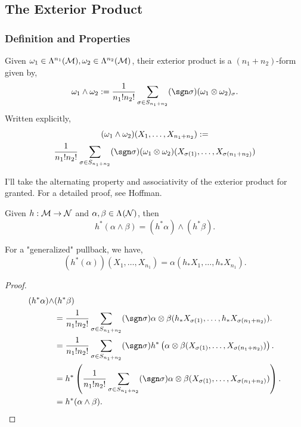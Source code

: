 \documentclass[../main.tex]{subfiles}
\begin{document}
    \subsection{The Exterior Product}
    \subsubsection{Definition and Properties}
    \begin{definition}\label{def:exterior-product}
        Given \(\omega_1 \in \form{n_1}{M}, \omega_2 \in \form{n_2}{M}\), their 
        exterior product is a \((n_1+n_2)\)-form given by, 
        \[
        \omega_1 \wedge \omega_2
         := \frac{1}{n_1!n_2!}
        \sum_{\sigma \in S_{n_1+n_2}}^{} (\sgn\sigma)(\omega_1 \otimes \omega_2)_\sigma.
        \]
        Written explicitly, 
        \begin{multline*}
        (\omega_1 \wedge \omega_2)(X_{1}, \dots, X_{n_1+n_2}):= \\
        \frac{1}{n_1!n_2!}
        \sum_{\sigma \in S_{n_1+n_2}}^{} (\sgn\sigma)(\omega_1 \otimes \omega_2)
        (X_{\sigma(1)}, \dots, X_{\sigma(n_1+n_2)})
        \end{multline*}
    \end{definition}
    \begin{remark}
        I'll take the alternating property and associativity of the exterior 
        product for granted. For a detailed proof, see Hoffman.
    \end{remark}
    \newpage
    \begin{theorem}\label{thm:exterior-commute-pullback}
        Given \(h : \manifold[M] \to \manifold[N]\) and \(\alpha, \beta \in 
        \form{}{N}\), then 
        \[
        h^*(\alpha \wedge \beta) = (h^*\alpha) \wedge (h^*\beta).
        \]
    \end{theorem}
    \begin{remark}
        For a "generalized" pullback, we have, 
        \[
        (h^*(\alpha))(X_1, \dots, X_{n_1}) = \alpha(h_*X_1, \dots, h_*X_{n_1}).
        \]
    \end{remark}
    \begin{proof}
        \begin{align*}
            (h^*\alpha)\wedge&(h^*\beta)\\
            &=\frac{1}{n_1!n_2!} \sum_{\sigma \in S_{n_1+n_2}}^{} 
            (\sgn\sigma) \alpha \otimes \beta (h_*X_{\sigma(1)}, \dots, h_*
            X_{\sigma(n_1+n_2)}). \\
            &=\frac{1}{n_1!n_2!} \sum_{\sigma \in S_{n_1+n_2}}^{} 
            (\sgn\sigma) h^*\left(\alpha \otimes \beta (X_{\sigma(1)}, \dots, 
            X_{\sigma(n_1+n_2)})\right). \\
            &=h^*\left(\frac{1}{n_1!n_2!} \sum_{\sigma \in S_{n_1+n_2}}^{} 
            (\sgn\sigma) \alpha \otimes \beta (X_{\sigma(1)}, \dots, 
            X_{\sigma(n_1+n_2)})\right). \\
            &=h^*(\alpha \wedge \beta).
        \end{align*}
    \end{proof}
\end{document}
